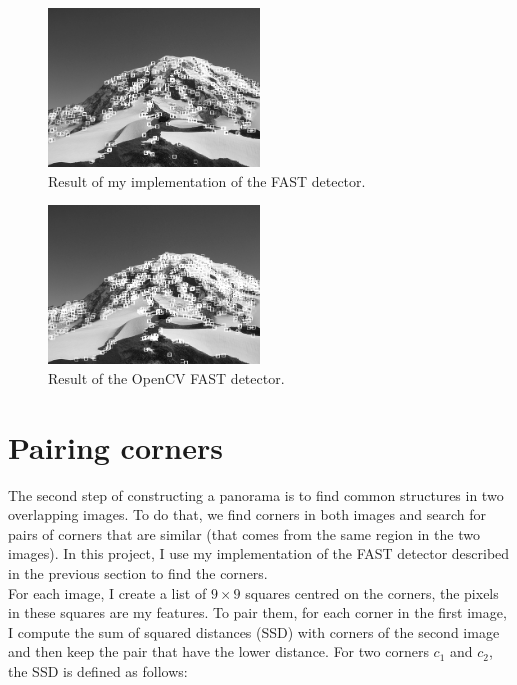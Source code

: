 \documentclass[a4paper,twocolumn]{article}
\begin{document}
\begin{figure}[h]
	\centering\includegraphics[width=0.5\textwidth]{images/my_fast.png}
	\caption{Result of my implementation of the FAST detector.}
	\label{my_fast}
\end{figure}

\begin{figure}[h]
	\centering\includegraphics[width=0.5\textwidth]{images/opencv_fast.png}
	\caption{Result of the OpenCV FAST detector.}
	\label{opencv_fast}
\end{figure}

\section{Pairing corners}

The second step of constructing a panorama is to find common structures in two overlapping images. To do that, we find corners in both images and search for pairs of corners that are similar (that comes from the same region in the two images). In this project, I use my implementation of the FAST detector described in the previous section to find the corners.
\\

For each image, I create a list of $9 \times 9$ squares centred on the corners, the pixels in these squares are my features. To pair them, for each corner in the first image, I compute the sum of squared distances (SSD) with corners of the second image and then keep the pair that have the lower distance. For two corners $c_1$ and $c_2$, the SSD is defined as follows:
\end{document}

